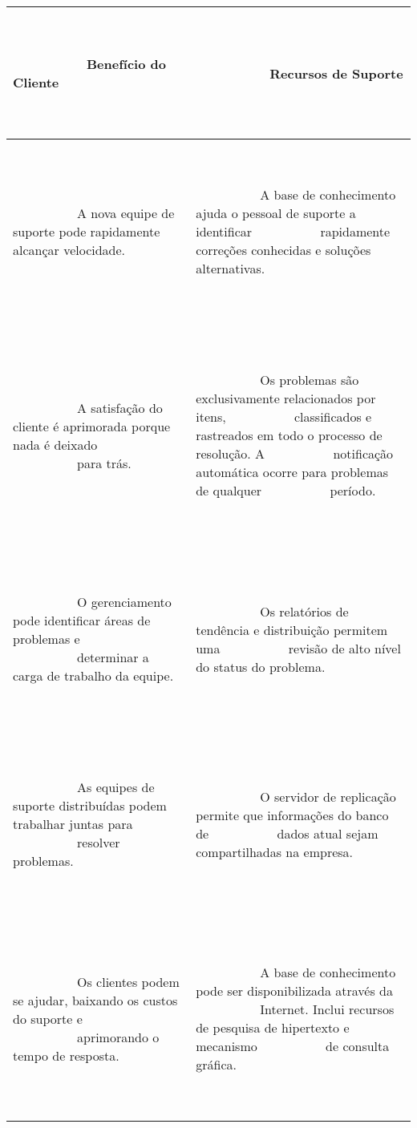 \documentclass[a4paper]{article}
\begin{document}
\begin{flushleft}
\tablefirsthead{}
\tablehead{}
\tabletail{}
\tablelasttail{}
\begin{supertabular}{|m{2.25806in}|m{2.74696in}|}
\hline
~

\ \ \ \ \ \ \ \ \ \ \textbf{Benef\'icio do Cliente}

~
 &
~

\ \ \ \ \ \ \ \ \ \ \textbf{Recursos de Suporte}

~
\\\hline
~

\ \ \ \ \ \ \ \ \ \ A nova equipe de suporte pode rapidamente alcan\c{c}ar velocidade.

~
 &
~

\ \ \ \ \ \ \ \ \ \ A base de conhecimento ajuda o pessoal de suporte a identificar \ \ \ \ \ \ \ \ \ \ rapidamente
corre\c{c}\~oes conhecidas e solu\c{c}\~oes alternativas.

~
\\\hline
~

\ \ \ \ \ \ \ \ \ \ A satisfa\c{c}\~ao do cliente \'e aprimorada porque nada \'e deixado \ \ \ \ \ \ \ \ \ \ para
tr\'as.

~
 &
~

\ \ \ \ \ \ \ \ \ \ Os problemas s\~ao exclusivamente relacionados por itens, \ \ \ \ \ \ \ \ \ \ classificados e
rastreados em todo o processo de resolu\c{c}\~ao. A \ \ \ \ \ \ \ \ \ \ notifica\c{c}\~ao autom\'atica ocorre para
problemas de qualquer \ \ \ \ \ \ \ \ \ \ per\'iodo.

~
\\\hline
~

\ \ \ \ \ \ \ \ \ \ O gerenciamento pode identificar \'areas de problemas e \ \ \ \ \ \ \ \ \ \ determinar a carga de
trabalho da equipe.

~
 &
~

\ \ \ \ \ \ \ \ \ \ Os relat\'orios de tend\^encia e distribui\c{c}\~ao permitem uma \ \ \ \ \ \ \ \ \ \ revis\~ao de
alto n\'ivel do status do problema.

~
\\\hline
~

\ \ \ \ \ \ \ \ \ \ As equipes de suporte distribu\'idas podem trabalhar juntas para \ \ \ \ \ \ \ \ \ \ resolver
problemas.

~
 &
~

\ \ \ \ \ \ \ \ \ \ O servidor de replica\c{c}\~ao permite que informa\c{c}\~oes do banco de \ \ \ \ \ \ \ \ \ \ dados
atual sejam compartilhadas na empresa.

~
\\\hline
~

\ \ \ \ \ \ \ \ \ \ Os clientes podem se ajudar, baixando os custos do suporte e \ \ \ \ \ \ \ \ \ \ aprimorando o tempo
de resposta.

~
 &
~

\ \ \ \ \ \ \ \ \ \ A base de conhecimento pode ser disponibilizada atrav\'es da \ \ \ \ \ \ \ \ \ \ Internet. Inclui
recursos de pesquisa de hipertexto e mecanismo \ \ \ \ \ \ \ \ \ \ de consulta gr\'afica.

~
\\\hline
\end{supertabular}
\end{flushleft}
\end{document}
